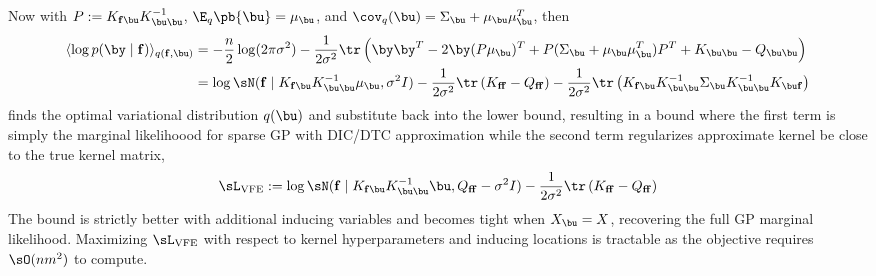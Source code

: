 \documentclass[11pt]{article}
\renewcommand\bf{\ensuremath{\mathbf{f}}}
\begin{document}
Now with $P:= K_{\bf\bu}K_{\bu\bu}^{-1}$, $\E_q\pb{\bu} = \mu_{\bu}$, and $\cov_q(\bu) = \Sigma_{\bu} + \mu_{\bu}\mu_{\bu}^T$, then
\begin{align}
    \langle \log p(\by\mid \bf) \rangle_{q(\bf,\bu)}
        &=  -\frac{n}{2} \log(2\pi \sigma^2) - \frac{1}{2\sigma^2} \tr\left( \by\by^T - 2\by ( P \mu_{\bu})^T + P ( \Sigma_{\bu} + \mu_{\bu}\mu_{\bu}^T ) P^T + K_{\bu\bu} - Q_{\bu\bu} \right) \\
        &=  \log \sN(\bf \mid K_{\bf\bu}K_{\bu\bu}^{-1}\mu_{\bu}, \sigma^2I) - \frac{1}{2 \sigma^2} \tr\left( K_{\bf\bf} - Q_{\bf\bf} \right) - \frac{1}{2\sigma^2} \tr\left( K_{\bf\bu}K_{\bu\bu}^{-1} \Sigma_{\bu} K_{\bu\bu}^{-1} K_{\bu\bf} \right)
    \label{eq:sparse_gp_vfe_elbo_1}
\end{align}
\cite{titsiasVariationalLearningInducing2009} finds the optimal variational distribution $q(\bu)$ and substitute back into the lower bound, resulting in a bound where the first term is simply the marginal likelihoood for sparse GP with DIC/DTC approximation while the second term regularizes approximate kernel be close to the true kernel matrix,
\begin{align}
    \sL_{\text{VFE}}
        :=  \log \sN(\bf \mid K_{\bf\bu}K_{\bu\bu}^{-1}\bu,Q_{\bf\bf} -  \sigma^2I) - \frac{1}{2\sigma^2} \tr\left( K_{\bf\bf} - Q_{\bf\bf} \right)
    \label{eq:sparse_gp_vfe_collapsed_bound}
\end{align}
The bound is strictly better with additional inducing variables and becomes tight when $X_{\bu}=X$, recovering the full GP marginal likelihood. Maximizing $\sL_{\text{VFE}}$ with respect to kernel hyperparameters and inducing locations is tractable as the objective requires $\sO(nm^2)$ to compute.
\end{document}
